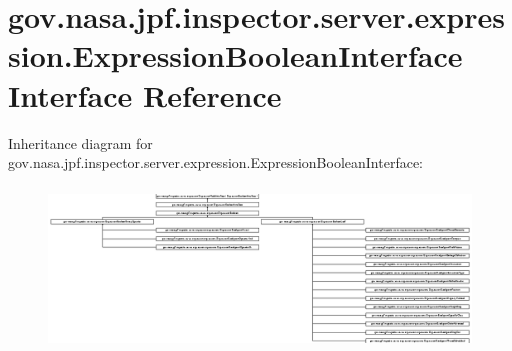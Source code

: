 \hypertarget{interfacegov_1_1nasa_1_1jpf_1_1inspector_1_1server_1_1expression_1_1_expression_boolean_interface}{}\section{gov.\+nasa.\+jpf.\+inspector.\+server.\+expression.\+Expression\+Boolean\+Interface Interface Reference}
\label{interfacegov_1_1nasa_1_1jpf_1_1inspector_1_1server_1_1expression_1_1_expression_boolean_interface}
Inheritance diagram for gov.\+nasa.\+jpf.\+inspector.\+server.\+expression.\+Expression\+Boolean\+Interface\+:\begin{figure}[H]
\begin{center}
\leavevmode
\includegraphics[height=4.344828cm]{interfacegov_1_1nasa_1_1jpf_1_1inspector_1_1server_1_1expression_1_1_expression_boolean_interface}
\end{center}
\end{figure}
